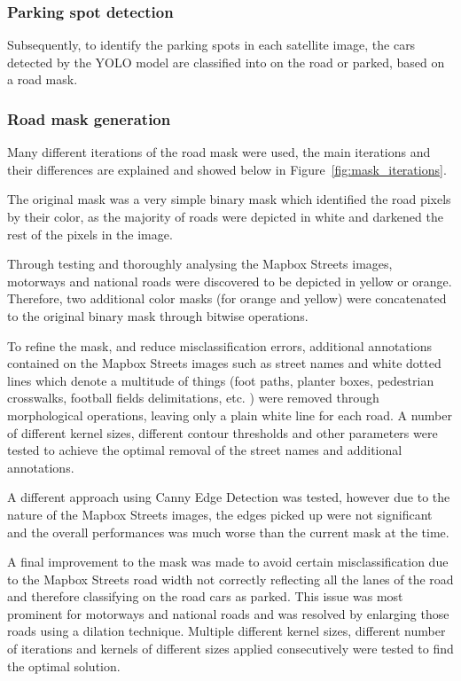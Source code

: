 \subsubsection{Parking spot detection}
Subsequently, to identify the parking spots in each satellite image, the cars
detected by the YOLO model are classified into on the road or parked, based on a
road mask.

\subsubsection{Road mask generation} \label{sec:road_mask_generation} Many
different iterations of the road mask were used, the main iterations and their
differences are explained and showed below in Figure~\ref{fig:mask_iterations}.

The original mask was a very simple binary mask which identified the road pixels
by their color, as the majority of roads were depicted in white and darkened the
rest of the pixels in the image.

Through testing and thoroughly analysing the Mapbox Streets images, motorways
and national roads were discovered to be depicted in yellow or orange.
Therefore, two additional color masks (for orange and yellow) were concatenated
to the original binary mask through bitwise operations.

To refine the mask, and reduce misclassification errors, additional annotations
contained on the Mapbox Streets images such as street names and white dotted
lines which denote a multitude of things (foot paths, planter boxes, pedestrian
crosswalks, football fields delimitations, etc. ) were removed through
morphological operations, leaving only a plain white line for each road. A
number of different kernel sizes, different contour thresholds and other
parameters were tested to achieve the optimal removal of the street names and
additional annotations.

A different approach using Canny Edge Detection was tested, however due to the
nature of the Mapbox Streets images, the edges picked up were not significant
and the overall performances was much worse than the current mask at the time.

\newpage{}

A final improvement to the mask was made to avoid certain misclassification due
to the Mapbox Streets road width not correctly reflecting all the lanes of the
road and therefore classifying on the road cars as parked. This issue was most
prominent for motorways and national roads and was resolved by enlarging those
roads using a dilation technique. Multiple different kernel sizes, different
number of iterations and kernels of different sizes applied consecutively were
tested to find the optimal solution.

